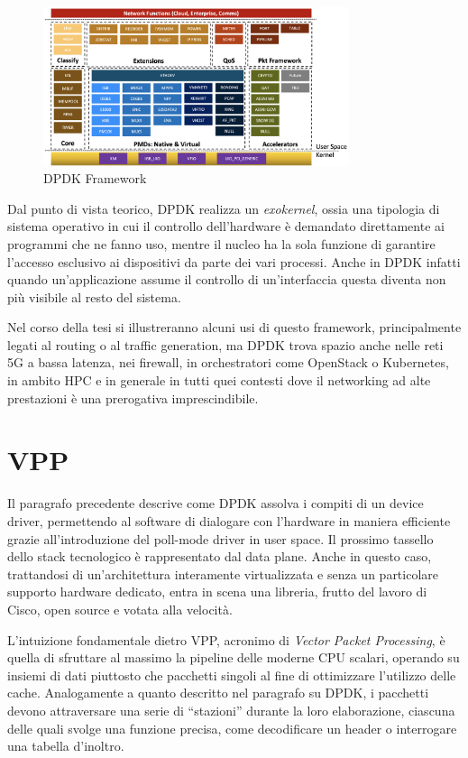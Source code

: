 \begin{figure}[htb]
    \includegraphics[width=0.8\textwidth]{graphics/dpdk-framework.png}
    \caption{DPDK Framework \cite{dpdk-intro}}
    \label{fig:dpdk-framework}
\end{figure}

Dal punto di vista teorico, DPDK realizza un \textit{exokernel}, ossia una tipologia di sistema operativo in cui il controllo dell'hardware è demandato direttamente ai programmi che ne fanno uso, mentre il nucleo ha la sola funzione di garantire l'accesso esclusivo ai dispositivi da parte dei vari processi. Anche in DPDK infatti quando un'applicazione assume il controllo di un'interfaccia questa diventa non più visibile al resto del sistema.

Nel corso della tesi si illustreranno alcuni usi di questo framework, principalmente legati al routing o al traffic generation, ma DPDK trova spazio anche nelle reti 5G a bassa latenza, nei firewall, in orchestratori come OpenStack o Kubernetes, in ambito HPC e in generale in tutti quei contesti dove il networking ad alte prestazioni è una prerogativa imprescindibile.

\section{VPP}
\label{sec:vpp}

Il paragrafo precedente descrive come DPDK assolva i compiti di un device driver, permettendo al software di dialogare con l'hardware in maniera efficiente grazie all'introduzione del poll-mode driver in user space. Il prossimo tassello dello stack tecnologico è rappresentato dal data plane. Anche in questo caso, trattandosi di un'architettura interamente virtualizzata e senza un particolare supporto hardware dedicato, entra in scena una libreria, frutto del lavoro di Cisco, open source e votata alla velocità.

L'intuizione fondamentale dietro VPP, acronimo di \textit{Vector Packet Processing}, è quella di sfruttare al massimo la pipeline delle moderne CPU scalari, operando su insiemi di dati piuttosto che pacchetti singoli al fine di ottimizzare l'utilizzo delle cache. Analogamente a quanto descritto nel paragrafo su DPDK, i pacchetti devono attraversare una serie di ``stazioni'' durante la loro elaborazione, ciascuna delle quali svolge una funzione precisa, come decodificare un header o interrogare una tabella d'inoltro.

